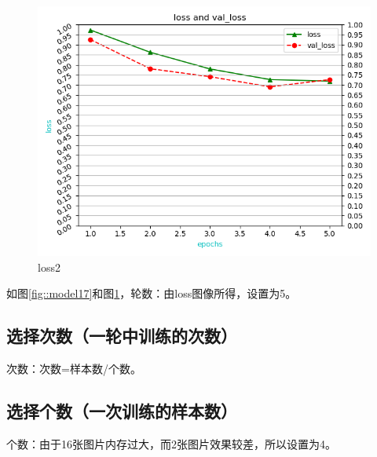 \begin{figure}[htbp]
\centering
\includegraphics[width=0.8\linewidth]{body/model_pic/loss2}
\caption{loss2}
\label{fig::model18}
\end{figure}

如图\ref{fig::model17}和图\ref{fig::model18}，轮数：由loss图像所得，设置为5。

\subsection{选择次数（一轮中训练的次数）}

次数：次数=样本数/个数。

\subsection{选择个数（一次训练的样本数）}

个数：由于16张图片内存过大，而2张图片效果较差，所以设置为4。

